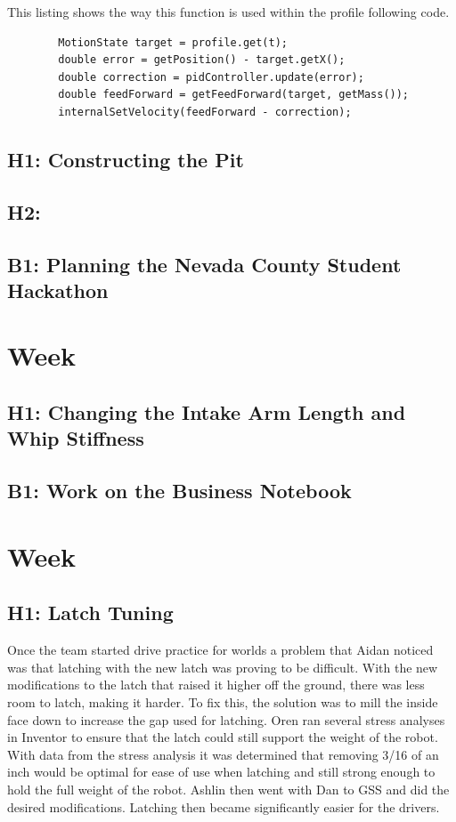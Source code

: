 \documentclass{article}
\begin{document}
This listing shows the way this function is used within the profile following code.
\begin{lstlisting}
        MotionState target = profile.get(t);
        double error = getPosition() - target.getX();
        double correction = pidController.update(error);
        double feedForward = getFeedForward(target, getMass());
        internalSetVelocity(feedForward - correction);
\end{lstlisting}

\subsection{H1: Constructing the Pit}

\subsection{H2: }

\subsection{B1: Planning the Nevada County Student Hackathon}

\clearpage \newpage \section{Week \thesection} 
\subsection{H1: Changing the Intake Arm Length and Whip Stiffness}

\subsection{B1: Work on the Business Notebook}

\clearpage \newpage \section{Week \thesection} 
\subsection{H1: Latch Tuning}

Once the team started drive practice for worlds a problem that Aidan noticed was that latching with the new latch was proving to be difficult. With the new modifications to the latch that raised it higher off the ground, there was less room to latch, making it harder. To fix this, the solution was to mill the inside face down to increase the gap used for latching. Oren ran several stress analyses in Inventor to ensure that the latch could still support the weight of the robot. With data from the stress analysis it was determined that removing 3/16 of an inch would be optimal for ease of use when latching and still strong enough to hold the full weight of the robot. Ashlin then went with Dan to GSS and did the desired modifications. Latching then became significantly easier for the drivers. 
\end{document}

